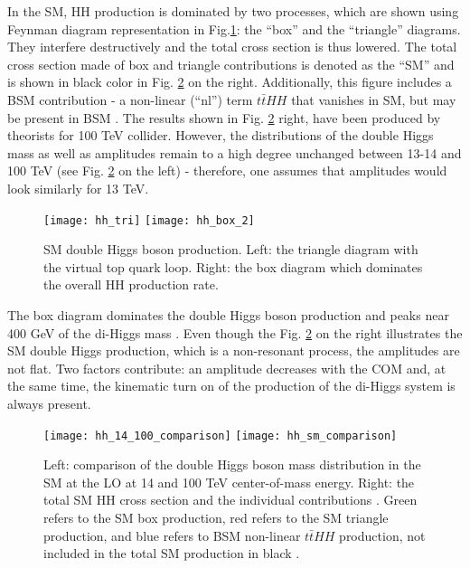 In the SM, HH production is dominated by two processes, which are shown using Feynman diagram representation in Fig.\ref{SM_HH}: the ``box'' and the ``triangle'' diagrams. They interfere destructively and the total cross section is thus lowered. The total cross section made of box and triangle contributions is denoted as the ``SM'' and is shown in black color in Fig. \ref{hh_comparison} on the right. Additionally, this figure includes a BSM contribution - a non-linear (``nl'') term $t\bar{t}HH$ that vanishes in SM, but may be present in BSM \cite{Contino:2012xk}. The results shown in Fig. \ref{hh_comparison} right, have been produced by theorists \cite{Chen:2014xra} for 100 TeV collider. However, the distributions of the double Higgs mass as well as amplitudes remain to a high degree unchanged between 13-14 and 100 TeV (see Fig. \ref{hh_comparison} on the left) - therefore, one assumes that amplitudes would look similarly for 13 TeV. 

\begin{figure}[H]
  \centering
    \texttt{[image: hh\_tri]}
     \texttt{[image: hh\_box\_2]}
    \caption[SM double Higgs boson production]{SM double Higgs boson production. Left: the triangle diagram with the virtual top quark loop. Right: the box diagram which dominates the overall HH production rate.}
    \label{SM_HH}
\end{figure}

The box diagram dominates the double Higgs boson production and peaks near 400 GeV of the di-Higgs mass \cite{Chen:2014xra}. Even though the Fig. \ref{hh_comparison} on the right illustrates the SM double Higgs production, which is a non-resonant process, the amplitudes are not flat. Two factors contribute: an amplitude decreases with the COM and, at the same time, the kinematic turn on of the production of the di-Higgs system is always present. 



\begin{figure}[H]
  \centering 
    \texttt{[image: hh\_14\_100\_comparison]}
    \texttt{[image: hh\_sm\_comparison]}
    \caption[Double Higgs mass distribution and the total cross-section]{Left: comparison of the double Higgs boson mass distribution in the SM at the LO at 14 and 100 TeV center-of-mass energy. Right: the total SM HH cross section and the individual contributions \cite{Contino:2012xk}. Green refers to the SM box production, red refers to the SM triangle production, and blue refers to BSM non-linear $t\bar{t}HH$ production, not included in the total SM production in black \cite{Chen:2014xra}. }
    \label{hh_comparison}
\end{figure}





